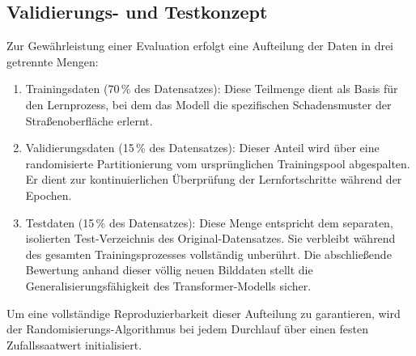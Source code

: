 \subsection{Validierungs- und Testkonzept}
\label{subsec:validierung}

Zur Gewährleistung einer Evaluation erfolgt eine Aufteilung der Daten in drei getrennte Mengen:
\begin{enumerate}
    \item Trainingsdaten (70\,\% des Datensatzes): Diese Teilmenge dient als Basis für den Lernprozess, bei dem das Modell die spezifischen Schadensmuster der Straßenoberfläche erlernt.
    \item Validierungsdaten (15\,\% des Datensatzes): Dieser Anteil wird über eine randomisierte Partitionierung vom ursprünglichen Trainingspool abgespalten. Er dient zur kontinuierlichen Überprüfung der Lernfortschritte während der Epochen.
    \item Testdaten (15\,\% des Datensatzes): Diese Menge entspricht dem separaten, isolierten Test-Verzeichnis des Original-Datensatzes. Sie verbleibt während des gesamten Trainingsprozesses vollständig unberührt. Die abschließende Bewertung anhand dieser völlig neuen Bilddaten stellt die Generalisierungsfähigkeit des Transformer-Modells sicher.
\end{enumerate}
Um eine vollständige Reproduzierbarkeit dieser Aufteilung zu garantieren, wird der Randomisierungs-Algorithmus bei jedem Durchlauf über einen festen Zufallssaatwert initialisiert.